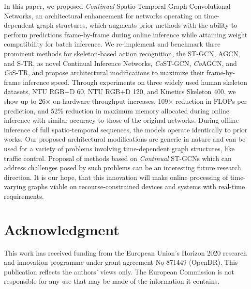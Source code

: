 \documentclass[journal]{IEEEtran}
\theoremstyle{definition}
\begin{document}
In this paper, we proposed \textit{Continual} Spatio-Temporal Graph Convolutional Networks, an architectural enhancement for
networks operating on time-dependent graph structures, 
which augments prior methods with the ability to perform predictions frame-by-frame during online inference while attaining weight compatibility for batch inference. We re-implement and benchmark three prominent methods {for skeleton-based action recognition}, the ST-GCN, AGCN, and S-TR, as novel Continual Inference Networks, \textit{Co}ST-GCN, \textit{Co}AGCN, and \textit{Co}S-TR, and propose architectural modifications to maximize their frame-by-frame inference speed.
Through experiments on three widely used human skeleton datasets, NTU RGB+D 60, NTU RGB+D 120, and Kinetics Skeleton 400, we show up to 26$\times$ on-hardware throughput increases, 109$\times$ reduction in FLOPs per prediction, and 52\% reduction in maximum memory allocated during online inference with similar accuracy to those of the original networks.
{During offline inference of full spatio-temporal sequences, the models operate identically to prior works.}
Our proposed architectural modifications are generic in nature and can be used for a variety of problems involving time-dependent graph structures, like traffic control. 
Proposal of methods based on \textit{Continual} ST-GCNs which can address challenges posed by such problems can be an interesting future research direction.
{It is our hope, that this innovation will make online processing of time-varying graphs viable} on recourse-constrained devices and systems with real-time requirements. \section*{Acknowledgment}
This work has received funding from the European Union’s Horizon 2020 research and innovation programme under grant agreement No 871449 (OpenDR). This publication reflects the authors’ views only. The European Commission is not responsible for any use that may be made of the information it contains. 













\renewcommand*{\bibfont}{\small}


\end{document}
